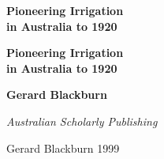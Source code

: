 \documentclass[11pt,b5paper,titlepage]{book}
\newcommand{\clearemptydoublepage}{\newpage{\pagestyle{empty}\cleardoublepage}}
\begin{document}
%

\frontmatter

\begin{titlepage}
\pagestyle{empty}

\begin{center}

\vspace*{60mm}


{\bfseries\sffamily\Huge Pioneering Irrigation \\[0.5ex]
in Australia to 1920}



\end{center}
\clearemptydoublepage

\begin{center}
\vspace*{30mm}

{\bfseries\sffamily\Huge Pioneering Irrigation \\[0.5ex]
in Australia to 1920}

\vspace{30mm}
{\bfseries\sffamily\huge Gerard Blackburn}

\vspace*{\fill}
{\sffamily\slshape\Large Australian Scholarly Publishing}
\end{center}
\newpage


\begin{raggedright}

\vspace*{15ex}

 Gerard Blackburn 1999


\end{raggedright}
\end{titlepage}
\end{document}
